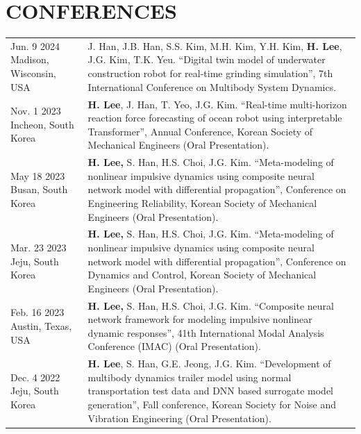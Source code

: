 \documentclass[a4paper,10pt]{extarticle}
\begin{document}
\section*{CONFERENCES}
\noindent
{}
\vspace*{-.5cm}
\begin{longtable}{LR}
	{Jun. 9 2024 \linebreak Madison, Wisconsin, USA} & J. Han, J.B. Han, S.S. Kim, M.H. Kim, Y.H. Kim, \textbf{H. Lee}, J.G. Kim, T.K. Yeu. “Digital twin model of underwater construction robot for real-time grinding simulation”, 7th International Conference on Multibody System Dynamics.                                  \\
	{Nov. 1 2023 \linebreak Incheon, South Korea}    & \textbf{H. Lee}, J. Han, T. Yeo, J.G. Kim. “Real-time multi-horizon reaction force forecasting of ocean robot using interpretable Transformer”, Annual Conference, Korean Society of Mechanical Engineers (Oral Presentation).                                            \\
	{May 18 2023 \linebreak Busan, South Korea}      & \textbf{H. Lee,} S. Han, H.S. Choi, J.G. Kim. “Meta-modeling of nonlinear impulsive dynamics using composite neural network model with differential propagation”, Conference on Engineering Reliability, Korean Society of Mechanical Engineers (Oral Presentation).      \\
	{Mar. 23 2023 \linebreak Jeju, South Korea}      & \textbf{H. Lee,} S. Han, H.S. Choi, J.G. Kim. “Meta-modeling of nonlinear impulsive dynamics using composite neural network model with differential propagation”, Conference on Dynamics and Control, Korean Society of Mechanical Engineers (Oral Presentation).         \\
	{Feb. 16 2023 \linebreak  Austin, Texas, USA}    & \textbf{H. Lee,} S. Han, H.S. Choi, J.G. Kim. “Composite neural network framework for modeling impulsive nonlinear dynamic responses”, 41th International Modal Analysis Conference (IMAC) (Oral Presentation).                                                           \\
	{Dec. 4 2022 \linebreak Jeju, South Korea}       & \textbf{H. Lee}, S. Han, G.E. Jeong, J.G. Kim. “Development of multibody dynamics trailer model using normal transportation test data and DNN based surrogate model generation”, Fall conference, Korean Society for Noise and Vibration Engineering (Oral Presentation). \\
\end{longtable}
\end{document}
